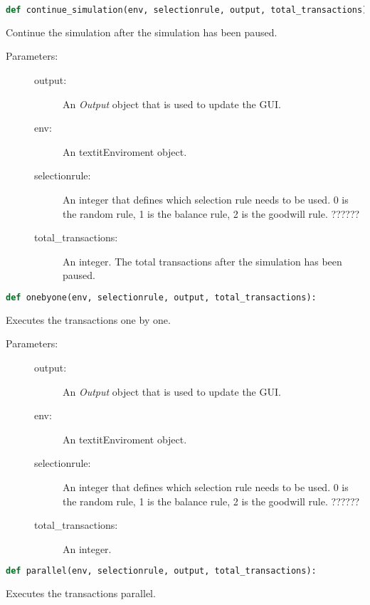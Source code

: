 \documentclass{article}
\begin{document}
\begin{lstlisting}[language=Python]
def continue_simulation(env, selectionrule, output, total_transactions):
\end{lstlisting}
Continue the simulation after the simulation has been paused.

\begin{description}
  \item[Parameters:] \hfill
	\begin{description}
  		\item[output:] An \textit{Output} object that is used to update the GUI.
		\item[env:] An textit{Enviroment} object.
		\item[selectionrule:]  An integer that defines which selection rule needs to be used. 0 is the random rule, 1 is the balance rule, 2 is the goodwill rule. ??????
		\item[total\_transactions:] An integer. The total transactions after the simulation has been paused.
	\end{description}
\end{description}

\begin{lstlisting}[language=Python]
def onebyone(env, selectionrule, output, total_transactions):
\end{lstlisting}
Executes the transactions one by one.

\begin{description}
  \item[Parameters:] \hfill
	\begin{description}
  		\item[output:] An \textit{Output} object that is used to update the GUI.
		\item[env:] An textit{Enviroment} object.
		\item[selectionrule:]  An integer that defines which selection rule needs to be used. 0 is the random rule, 1 is the balance rule, 2 is the goodwill rule. ??????
		\item[total\_transactions:] An integer.
	\end{description}
\end{description}

\begin{lstlisting}[language=Python]
def parallel(env, selectionrule, output, total_transactions):
\end{lstlisting}
Executes the transactions parallel.
\end{document}
